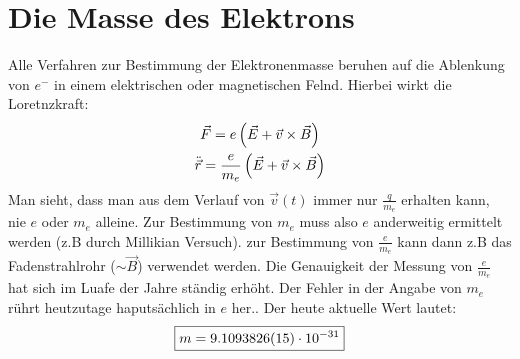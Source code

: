 \section{Die Masse des Elektrons} %
\label{sec:Die_Masse_des_Elektrons}
Alle Verfahren zur Bestimmung der Elektronenmasse beruhen auf die Ablenkung von
$e^-$ in einem elektrischen oder magnetischen Felnd. Hierbei wirkt die
Loretnzkraft:
\begin{gather*}
    \vec{F}=e \left( \vec{E} + \vec{v} \times \vec{B} \right) \\
    \ddot{\vec{r}} = \frac{e}{m_e}  \left( \vec{E} + \vec{v} \times \vec{B} \right) 
\end{gather*}
Man sieht, dass man aus dem Verlauf von $\vec{v}(t)$ immer nur $\frac{q}{m_e}$
erhalten kann, nie $e$ oder $m_e$ alleine. Zur Bestimmung von $m_e$ muss also
$e$ anderweitig ermittelt werden (z.B durch Millikian Versuch). zur Bestimmung
von $\frac{e}{m_e}$ kann dann z.B das Fadenstrahlrohr ($\sim \vec{B}$)
verwendet werden. Die Genauigkeit der Messung von $ \frac{e}{m_e}$ hat sich im
Luafe der Jahre ständig erhöht. Der Fehler in der Angabe von $m_e$ rührt
heutzutage haputsächlich in $e$ her.. Der heute aktuelle Wert lautet:
\begin{equation*}
    \boxed{
    m = 9.1093826(15) \cdot 10^{-31}
    }
\end{equation*}


